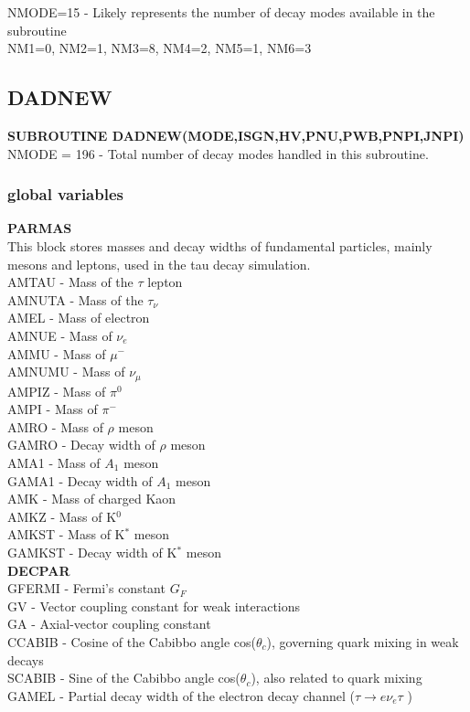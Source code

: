 \documentclass[12pt]{article}
\begin{document}
NMODE=15   - Likely represents the number of decay modes available in the subroutine\\
NM1=0, NM2=1, NM3=8, NM4=2, NM5=1, NM6=3




\subsection{DADNEW}
\textbf{SUBROUTINE DADNEW(MODE,ISGN,HV,PNU,PWB,PNPI,JNPI)}\\
NMODE = 196 - Total number of decay modes handled in this subroutine.


\subsubsection{global variables}
\textbf{PARMAS}\\
This block stores masses and decay widths of fundamental particles, mainly mesons and leptons, used in the tau decay simulation.\\
AMTAU  - Mass of the $\tau$ lepton\\
AMNUTA - Mass of the $\tau_\nu$\\
AMEL   - Mass of electron\\
AMNUE  - Mass of $\nu_e$\\
AMMU   - Mass of $\mu^-$\\
AMNUMU - Mass of $\nu_\mu$\\
AMPIZ  - Mass of $\pi^0$\\
AMPI   - Mass of $\pi^-$\\
AMRO   - Mass of $\rho$ meson\\
GAMRO  - Decay width of $\rho$ meson\\
AMA1   - Mass of $A_1$ meson\\
GAMA1  - Decay width of $A_1$ meson\\
AMK    - Mass of charged Kaon\\
AMKZ   - Mass of K$^0$\\
AMKST  - Mass of K$^*$ meson\\
GAMKST - Decay width of K$^*$ meson\\


\textbf{DECPAR}\\
GFERMI - Fermi's constant $G_F$\\
GV     - Vector coupling constant for weak interactions\\
GA     - Axial-vector coupling constant\\
CCABIB - Cosine of the Cabibbo angle cos($\theta_c$), governing quark mixing in weak decays\\
SCABIB - Sine of the Cabibbo angle cos($\theta_c$), also related to quark mixing\\
GAMEL  - Partial decay width of the electron decay channel ($\tau \rightarrow e \nu_e \tau$ )\\
\end{document}
